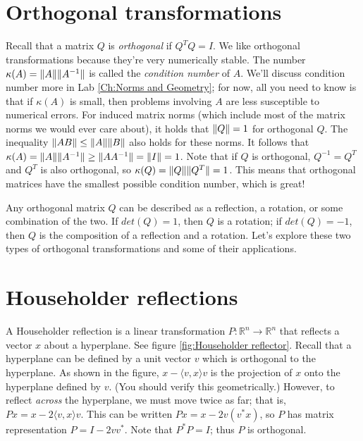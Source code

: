 \label{Ch:Canonical Transformations}


\section*{Orthogonal transformations}
Recall that a matrix $Q$ is \emph{orthogonal} if $Q^TQ = I$. We like orthogonal transformations because they're very numerically stable. The number $\kappa(A) = \lVert A\rVert \lVert A^{-1}\rVert$ is called the \emph{condition number} of $A$. We'll discuss condition number more in Lab \ref{Ch:Norms and Geometry}; for now, all you need to know is that if $\kappa(A)$ is small, then problems involving $A$ are less susceptible to numerical errors. For induced matrix norms (which include most of the matrix norms we would ever care about),  it holds that $\lVert Q\rVert=1$ for orthogonal $Q$. The inequality $\lVert AB\rVert \leq \lVert A\rVert \lVert B\rVert$ also holds for these norms. It follows that $\kappa(A) = \lVert A\rVert \lVert A^{-1}\rVert \geq \lVert A A^{-1}\rVert = \lVert I\rVert = 1$. Note that if $Q$ is orthogonal, $Q^{-1} = Q^T$ and $Q^T$ is also orthogonal, so $\kappa(Q) = \lVert Q\rVert \lVert Q^T\rVert = 1$. This means that orthogonal matrices have the smallest possible condition number, which is great!

Any orthogonal matrix $Q$ can be described as a reflection, a rotation, or some combination of the two. If $det(Q) = 1$, then $Q$ is a rotation; if $det(Q) = -1$, then $Q$  is the composition of a reflection and a rotation.  Let's explore these two types of orthogonal transformations and some of their applications.

\section*{Householder reflections}
A Householder reflection is a linear transformation $P: \mathbb{R}^n \rightarrow \mathbb{R}^n$ that reflects a vector $x$ about a hyperplane. See figure \ref{fig:Householder reflector}. Recall that a hyperplane can be defined by a unit vector $v$ which is orthogonal to the hyperplane. As shown in the figure, $x - \langle v,x \rangle v$ is the projection of $x$ onto the hyperplane defined by $v$. (You should verify this geometrically.) However, to reflect \emph{across} the hyperplane, we must move twice as far; that is, $Px = x - 2\langle v,x \rangle v$. This can be written $Px = x - 2v(v^\ast x)$, so $P$ has matrix representation $P = I - 2vv^\ast$. Note that $P^\ast P = I$; thus $P$ is orthogonal.

